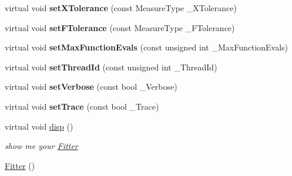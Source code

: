 \begin{DoxyCompactItemize}
\item 
\hypertarget{class_ox_1_1_fitter_ad2b680ee88b12dd51538a2da865b2589}{virtual void {\bfseries set\-X\-Tolerance} (const Measure\-Type \-\_\-\-X\-Tolerance)}\label{class_ox_1_1_fitter_ad2b680ee88b12dd51538a2da865b2589}

\item 
\hypertarget{class_ox_1_1_fitter_aca7109a663e737c46cb29483c2276f4a}{virtual void {\bfseries set\-F\-Tolerance} (const Measure\-Type \-\_\-\-F\-Tolerance)}\label{class_ox_1_1_fitter_aca7109a663e737c46cb29483c2276f4a}

\item 
\hypertarget{class_ox_1_1_fitter_a293d2876b8b053bd637c35c3f6f3f68e}{virtual void {\bfseries set\-Max\-Function\-Evals} (const unsigned int \-\_\-\-Max\-Function\-Evals)}\label{class_ox_1_1_fitter_a293d2876b8b053bd637c35c3f6f3f68e}

\item 
\hypertarget{class_ox_1_1_fitter_aa1fc4674aa6a3e6c8567c86ec1fa90e0}{virtual void {\bfseries set\-Thread\-Id} (const unsigned int \-\_\-\-Thread\-Id)}\label{class_ox_1_1_fitter_aa1fc4674aa6a3e6c8567c86ec1fa90e0}

\item 
\hypertarget{class_ox_1_1_fitter_a696da03b83fe3083f29ae4c0e2ecfc44}{virtual void {\bfseries set\-Verbose} (const bool \-\_\-\-Verbose)}\label{class_ox_1_1_fitter_a696da03b83fe3083f29ae4c0e2ecfc44}

\item 
\hypertarget{class_ox_1_1_fitter_a4ac0096f6bc6d733c542d28a839d32c9}{virtual void {\bfseries set\-Trace} (const bool \-\_\-\-Trace)}\label{class_ox_1_1_fitter_a4ac0096f6bc6d733c542d28a839d32c9}

\item 
\hypertarget{class_ox_1_1_fitter_a0a9b45eb21ba174327f95a894e6331b6}{virtual void \hyperlink{class_ox_1_1_fitter_a0a9b45eb21ba174327f95a894e6331b6}{disp} ()}\label{class_ox_1_1_fitter_a0a9b45eb21ba174327f95a894e6331b6}

\begin{DoxyCompactList}\small\item\em show me your \hyperlink{class_ox_1_1_fitter}{Fitter} \end{DoxyCompactList}\item 
\hypertarget{class_ox_1_1_fitter_a7b42acb389394bc4c496990eea8b9ac9}{\hyperlink{class_ox_1_1_fitter_a7b42acb389394bc4c496990eea8b9ac9}{Fitter} ()}\label{class_ox_1_1_fitter_a7b42acb389394bc4c496990eea8b9ac9}


\end{DoxyCompactItemize}
